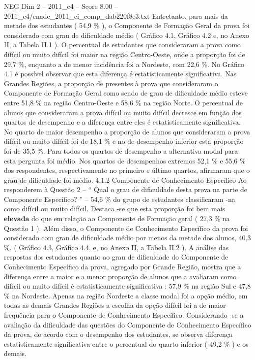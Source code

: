 \begin{textsample}{NEG Dim 2 – 2011\_c4 – Score 8.00 – 2011\_c4/enade\_2011\_ci\_comp\_dab220f8e3.txt}
Entretanto, para mais da metade dos estudantes ( 54,9 \% ), o Componente de Formação Geral da prova foi considerado com grau de dificuldade médio ( Gráfico 4.1, Gráfico 4.2 e, no Anexo II, a Tabela II.1 ).
O percentual de estudantes que consideraram a prova como difícil ou muito difícil foi maior na região Centro-Oeste, onde a proporção foi de 29,7 \%, enquanto a de menor incidência foi a Nordeste, com 22,6 \%.
No Gráfico 4.1 é possível observar que esta diferença é estatisticamente significativa.
Nas Grandes Regiões, a proporção de presentes à prova que consideraram o Componente de Formação Geral como sendo de grau de dificuldade médio esteve entre 51,8 \% na região Centro-Oeste e 58,6 \% na região Norte.
O percentual de alunos que consideraram a prova difícil ou muito difícil decresce em função dos quartos de desempenho e a diferença entre eles é estatisticamente significativa.
No quarto de maior desempenho a proporção de alunos que consideraram a prova difícil ou muito difícil foi de 18,1 \% e no de desempenho inferior esta proporção foi de 35,5 \%.
Para todos os quartos de desempenho a alternativa modal para esta pergunta foi médio.
Nos quartos de desempenhos extremos 52,1 \% e 55,6 \% dos respondentes, respectivamente no primeiro e último quartos, afirmaram que o grau de dificuldade foi médio. 4.1.2 Componente de Conhecimento Específico Ao responderem à Questão 2 – “ Qual o grau de dificuldade desta prova na parte de Componente Específico? ” – 54,6 \% do grupo de estudantes classificaram -na como difícil ou muito difícil.
Destaca -se que esta proporção foi bem mais \textbf{elevada} do que em relação ao Componente de Formação geral ( 27,3 \% na Questão 1 ).
Além disso, o Componente de Conhecimento Específico da prova foi considerado com grau de dificuldade médio por menos da metade dos alunos, 40,3 \%. ( Gráfico 4.3, Gráfico 4.4, e, no Anexo II, a Tabela II.2 ).
A análise das respostas dos estudantes quanto ao grau de dificuldade do Componente de Conhecimento Específico da prova, agregado por Grande Região, mostra que a diferença entre a maior e a menor proporção de alunos que a avaliaram como difícil ou muito difícil é estatisticamente significativa : 57,9 \% na região Sul e 47,8 \% na Nordeste.
Apenas na região Nordeste a classe modal foi a opção médio, em todas as demais Grandes Regiões a escolha da opção difícil foi a de maior frequência para o Componente de Conhecimento Específico.
Considerando -se a avaliação da dificuldade das questões do Componente de Conhecimento Específico da prova, de acordo com o desempenho dos estudantes, se observa diferença estatisticamente significativa entre o percentual do quarto inferior ( 49,2 \% ) e os demais.

\end{textsample}
